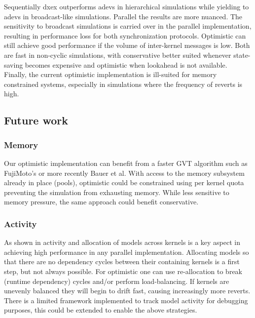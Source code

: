 Sequentially dxex outperforms adevs in hierarchical simulations while yielding to adevs in broadcast-like simulations. 
Parallel the results are more nuanced. The sensitivity to broadcast simulations is carried over in the parallel implementation, resulting in performance loss for both synchronization protocols. Optimistic can still achieve good performance if the volume of inter-kernel messages is low. Both  are fast in non-cyclic simulations, with conservative better suited whenever state-saving becomes expensive and optimistic when lookahead is not available.\\
Finally, the current optimistic implementation is ill-suited for memory constrained systems, especially in simulations where the frequency of reverts is high.
\subsection{Future work}
\subsubsection{Memory}
Our optimistic implementation can benefit from a faster GVT algorithm such as FujiMoto's \cite{Fujimoto:1997:CGV:268403.268404}  or more recently Bauer et al\cite{Bauer:2005:SND:1069810.1070159}. 
With access to the memory subsystem already in place (pools), optimistic could be constrained using per kernel quota preventing the simulation from exhausting memory. While less sensitive to memory pressure, the same approach could benefit conservative.
\subsubsection{Activity}
As shown in \cite{PythonPDEVS_ACTIMS} activity and allocation of models across kernels is a key aspect in achieving high performance in any parallel implementation. Allocating models so that there are no dependency cycles between their containing kernels is a first step, but not always possible. For optimistic one can use re-allocation to break (runtime dependency) cycles and/or perform load-balancing. If kernels are unevenly balanced they will begin to drift fast, causing increasingly more reverts. There is a limited framework implemented to track model activity for debugging purposes, this could be extended to enable the above strategies.
